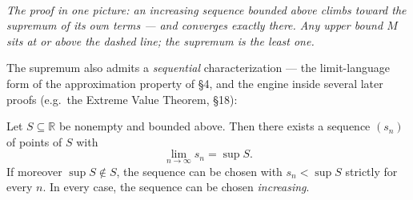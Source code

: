 \documentclass[11pt]{report}
\newcommand{\figcap}[1]{\\[1.5mm]\parbox{0.92\textwidth}{\small\itshape #1}}
\begin{document}
\begin{center}
\figcap{The proof in one picture: an increasing sequence bounded above climbs toward the supremum of its own terms --- and converges exactly there. Any upper bound $M$ sits at or above the dashed line; the supremum is the least one.}
\end{center}


The supremum also admits a \emph{sequential} characterization --- the limit-language form of the approximation property of \S 4, and the engine inside several later proofs (e.g.\ the Extreme Value Theorem, \S 18):

\begin{propbox}
Let $S \subseteq \mathbb{R}$ be nonempty and bounded above. Then there exists a sequence $(s_n)$ of points of $S$ with
\[
\lim_{n\to\infty} s_n = \sup S.
\]
If moreover $\sup S \notin S$, the sequence can be chosen with $s_n < \sup S$ strictly for every $n$. In every case, the sequence can be chosen \emph{increasing}.
\end{propbox}
\end{document}
